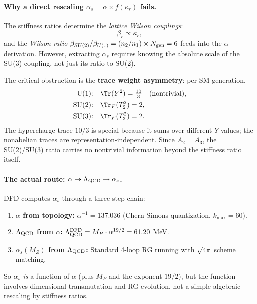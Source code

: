 \paragraph{Why a direct rescaling $\alpha_s = \alpha \times f(\kappa_r)$ fails.}
The stiffness ratios determine the \emph{lattice Wilson couplings}:
\begin{equation}
\beta_r \propto \kappa_r,
\end{equation}
and the \emph{Wilson ratio} $\beta_{SU(2)}/\beta_{U(1)} = (n_2/n_1) \times N_{\rm gen} = 6$
feeds into the $\alpha$ derivation. However, extracting $\alpha_s$ requires knowing
the absolute scale of the SU(3) coupling, not just its ratio to SU(2).

The critical obstruction is the \textbf{trace weight asymmetry}: per SM generation,
\begin{align}
\text{U(1):} & \quad \Tr(Y^2) = \tfrac{10}{3} \quad \text{(nontrivial)}, \\
\text{SU(2):} & \quad \Tr_F(T_2^2) = 2, \\
\text{SU(3):} & \quad \Tr_F(T_3^2) = 2.
\end{align}
The hypercharge trace $10/3$ is special because it sums over different $Y$ values;
the nonabelian traces are representation-independent. Since $A_2 = A_3$, the
SU(2)/SU(3) ratio carries no nontrivial information beyond the stiffness ratio itself.

\paragraph{The actual route: $\alpha \to \Lambda_{\rm QCD} \to \alpha_s$.}
DFD computes $\alpha_s$ through a three-step chain:
\begin{enumerate}
\item \textbf{$\alpha$ from topology:} $\alpha^{-1} = 137.036$ (Chern-Simons quantization, $k_{\max} = 60$).
\item \textbf{$\Lambda_{\rm QCD}$ from $\alpha$:} $\Lambda_{\rm QCD}^{\rm DFD} = M_P \cdot \alpha^{19/2} = 61.20$ MeV.
\item \textbf{$\alpha_s(M_Z)$ from $\Lambda_{\rm QCD}$:} Standard 4-loop RG running with $\sqrt{4\pi}$ scheme matching.
\end{enumerate}

So $\alpha_s$ \emph{is} a function of $\alpha$ (plus $M_P$ and the exponent $19/2$),
but the function involves dimensional transmutation and RG evolution, not a simple
algebraic rescaling by stiffness ratios.

